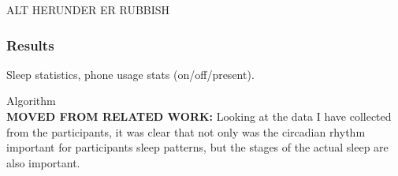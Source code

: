 \documentclass[12pt]{article} %
\begin{document}
\newpage
ALT HERUNDER ER RUBBISH






\subsubsection{Results}
Sleep statistics, phone usage stats (on/off/present). 


Algorithm\\

\textbf{MOVED FROM RELATED WORK:}
Looking at the data I have collected from the participants, it was clear that not only was the circadian rhythm important for participants sleep patterns, but the stages of the actual sleep are also important. 
\end{document}
